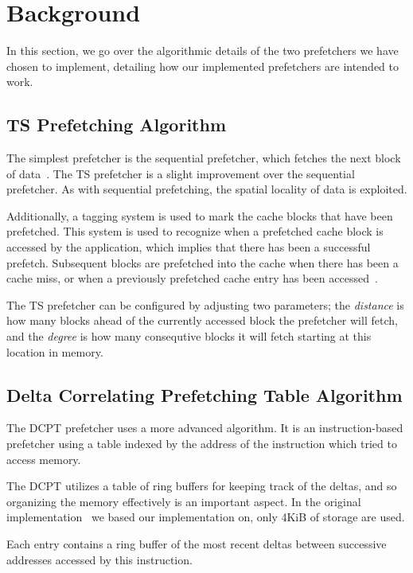 \section{Background}

In this section, we go over the algorithmic details of the two prefetchers we
have chosen to implement, detailing how our implemented prefetchers are intended
to work.

\subsection{TS Prefetching Algorithm}

The simplest prefetcher is the sequential prefetcher, which fetches the next
block of data~\cite{seq}. The TS prefetcher is a slight improvement over the
sequential prefetcher. As with sequential prefetching, the spatial locality of
data is exploited.

Additionally, a tagging system is used to mark the cache blocks that have been
prefetched. This system is used to recognize when a prefetched cache block is
accessed by the application, which implies that there has been a successful
prefetch. Subsequent blocks are prefetched into the cache when there has been a
cache miss, or when a previously prefetched cache entry has been
accessed~\cite{grannaes}.

The TS prefetcher can be configured by adjusting two parameters; the
\emph{distance} is how many blocks ahead of the currently accessed block the
prefetcher will fetch, and the \emph{degree} is how many consequtive blocks it
will fetch starting at this location in memory.

\subsection{Delta Correlating Prefetching Table Algorithm}

The DCPT prefetcher uses a more advanced algorithm. It is an instruction-based
prefetcher using a table indexed by the address of the instruction which tried
to access memory.

The DCPT utilizes a table of ring buffers for keeping track of the deltas, and
so organizing the memory effectively is an important aspect. In the original
implementation~\cite{dcpt} we based our implementation on, only 4KiB of storage
are used.

Each entry contains a ring buffer of the most recent deltas between successive
addresses accessed by this instruction.

